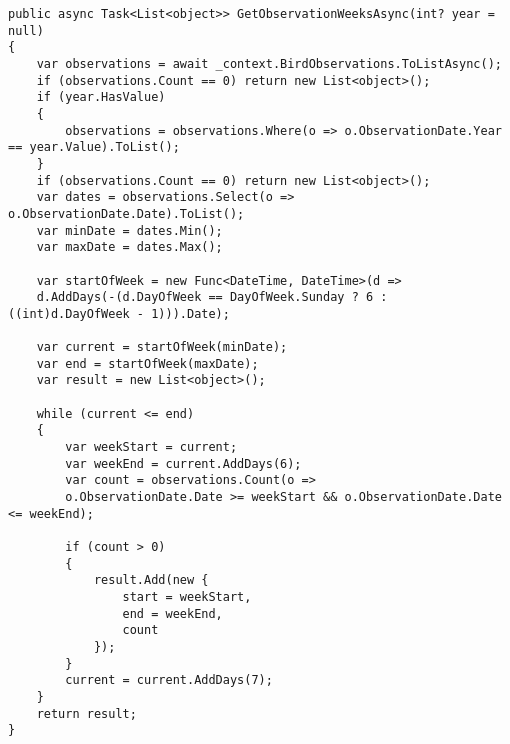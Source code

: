 \begin{lstlisting}[style=csharp, caption={Implementacja serwisu tygodni},label={lst:backendserwistygodni}]
public async Task<List<object>> GetObservationWeeksAsync(int? year = null)
{
	var observations = await _context.BirdObservations.ToListAsync();
	if (observations.Count == 0) return new List<object>();
	if (year.HasValue)
	{
		observations = observations.Where(o => o.ObservationDate.Year == year.Value).ToList();
	}
	if (observations.Count == 0) return new List<object>();
	var dates = observations.Select(o => o.ObservationDate.Date).ToList();
	var minDate = dates.Min();
	var maxDate = dates.Max();
	
	var startOfWeek = new Func<DateTime, DateTime>(d => 
	d.AddDays(-(d.DayOfWeek == DayOfWeek.Sunday ? 6 : ((int)d.DayOfWeek - 1))).Date);
	
	var current = startOfWeek(minDate);
	var end = startOfWeek(maxDate);
	var result = new List<object>();
	
	while (current <= end)
	{
		var weekStart = current;
		var weekEnd = current.AddDays(6);
		var count = observations.Count(o => 
		o.ObservationDate.Date >= weekStart && o.ObservationDate.Date <= weekEnd);
		
		if (count > 0)
		{
			result.Add(new {
				start = weekStart,
				end = weekEnd,
				count
			});
		}
		current = current.AddDays(7);
	}
	return result;
}
\end{lstlisting}